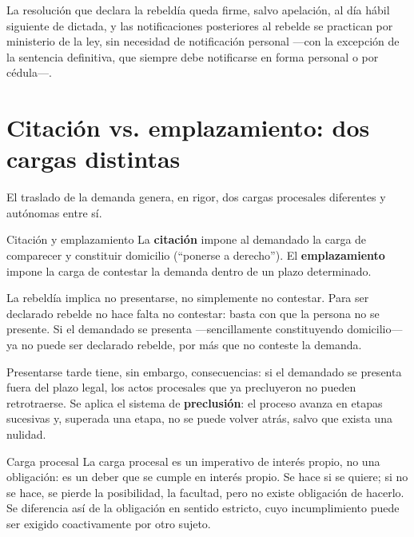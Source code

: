 \documentclass[12pt,oneside]{book}
\begin{document}
\begin{note}
La resolución que declara la rebeldía queda firme, salvo apelación, al día hábil siguiente de dictada, y las notificaciones posteriores al rebelde se practican por ministerio de la ley, sin necesidad de notificación personal —con la excepción de la sentencia definitiva, que siempre debe notificarse en forma personal o por cédula—.
\end{note}

\section{Citación vs. emplazamiento: dos cargas distintas}

El traslado de la demanda genera, en rigor, dos cargas procesales diferentes y autónomas entre sí.

\begin{definition}{Citación y emplazamiento}
La \textbf{citación} impone al demandado la carga de comparecer y constituir domicilio (``ponerse a derecho''). El \textbf{emplazamiento} impone la carga de contestar la demanda dentro de un plazo determinado.
\end{definition}

\begin{important}
La rebeldía implica no presentarse, no simplemente no contestar. Para ser declarado rebelde no hace falta no contestar: basta con que la persona no se presente. Si el demandado se presenta —sencillamente constituyendo domicilio— ya no puede ser declarado rebelde, por más que no conteste la demanda.
\end{important}

Presentarse tarde tiene, sin embargo, consecuencias: si el demandado se presenta fuera del plazo legal, los actos procesales que ya precluyeron no pueden retrotraerse. Se aplica el sistema de \textbf{preclusión}: el proceso avanza en etapas sucesivas y, superada una etapa, no se puede volver atrás, salvo que exista una nulidad.

\begin{definition}{Carga procesal}
La carga procesal es un imperativo de interés propio, no una obligación: es un deber que se cumple en interés propio. Se hace si se quiere; si no se hace, se pierde la posibilidad, la facultad, pero no existe obligación de hacerlo. Se diferencia así de la obligación en sentido estricto, cuyo incumplimiento puede ser exigido coactivamente por otro sujeto.
\end{definition}
\end{document}
